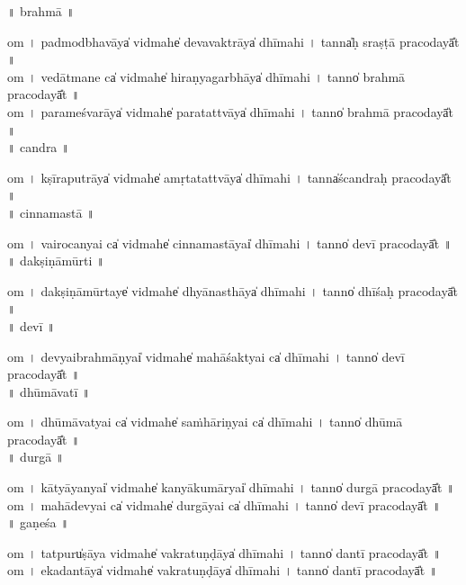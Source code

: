 \documentclass[parskip, DIV=14]{scrartcl}
\begin{document}
\vspace{0.201cm} ॥   brahmā  ॥ \par
  om  । pa॒dmo॒dbha॒vāya̍ vi॒dmahe̍ devava॒ktrāya̍ dhīmahi  ।  tanna̍ḥ sraṣṭā praco॒dayā̎t ॥ \\
  om  । ve॒dā॒tma॒ne ca̍ vi॒dmahe̍ hiraṇyaga॒rbhāya̍ dhīmahi  ।  tanno̍ brahmā praco॒dayā̎t ॥ \\
  om  । pa॒ra॒me॒śva॒rāya̍ vi॒dmahe̍ parata॒ttvāya̍  dhīmahi  ।  tanno̍ brahmā praco॒dayā̎t ॥ \\

\vspace{0.201cm} ॥   candra  ॥ \par
  om  । kṣī॒ra॒pu॒trāya̍ vi॒dmahe̍ amṛtata॒ttvāya̍ dhīmahi  ।  tanna̍ścandraḥ praco॒dayā̎t ॥ \\

\vspace{0.201cm} ॥   cinnamastā  ॥ \par
  om  । vai॒ro॒ca॒nyai ca̍ vi॒dmahe̍ cinnama॒stāyai̍ dhīmahi  ।  tanno̍ devī praco॒dayā̎t ॥ \\

\vspace{0.201cm} ॥   dakṣiṇāmūrti  ॥ \par
  om  । da॒kṣi॒ṇā॒mū॒rtaye̍ vi॒dmahe̍ dhyāna॒sthāya̍ dhīmahi  ।  tanno̍ dhīśaḥ praco॒dayā̎t ॥ \\

\vspace{0.201cm} ॥   devī  ॥ \par
  om  । de॒vyai॒bra॒hmāṇyai̍ vi॒dmahe̍ mahāśa॒ktyai ca̍ dhīmahi  ।  tanno̍ devī praco॒dayā̎t ॥ \\

\vspace{0.201cm} ॥   dhūmāvatī  ॥ \par
  om  । dhū॒mā॒va॒tyai ca̍ vi॒dmahe̍ saṁhāriṇyai ca̍ dhīmahi  ।  tanno̍ dhūmā praco॒dayā̎t ॥ \\

\vspace{0.201cm} ॥   durgā  ॥ \par
  om  । kā॒tyā॒ya॒nyai̍ vi॒dmahe̍ kanyāku॒māryai̍ dhīmahi  ।  tanno̍ durgā praco॒dayā̎t ॥ \\
  om  । ma॒hā॒de॒vyai ca̍ vi॒dmahe̍ durgā॒yai ca̍ dhīmahi  ।  tanno̍ devī praco॒dayā̎t ॥ \\

\vspace{0.201cm} ॥   gaṇeśa  ॥ \par
  om  । tatpuru̍ṣāya vi॒dmahe̍ vakratu॒ṇḍāya̍ dhīmahi  ।  tanno̍ dantī praco॒dayā̎t ॥ \\
  om  । e॒ka॒da॒ntāya̍ vi॒dmahe̍ vakratu॒ṇḍāya̍ dhīmahi  ।  tanno̍ dantī praco॒dayā̎t ॥ \\
\end{document}
